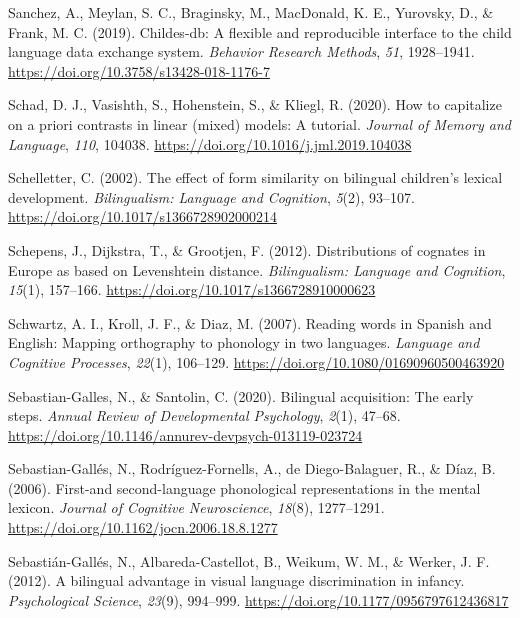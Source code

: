 \documentclass[
  12pt,
  b5paperpaper,
  twoside]{scrreprt}
\newlength{\cslhangindent}
\newlength{\cslentryspacingunit} %
\newenvironment{CSLReferences}[2] %
 {%
  \setlength{\parindent}{0pt}
  \ifodd #1
  \let\oldpar\par
  \def\par{\hangindent=\cslhangindent\oldpar}
  \fi
  \setlength{\parskip}{#2\cslentryspacingunit}
 }%
 {}
\begin{document}
\begin{CSLReferences}{1}{0}
\leavevmode{}%
Sanchez, A., Meylan, S. C., Braginsky, M., MacDonald, K. E., Yurovsky,
D., \& Frank, M. C. (2019). Childes-db: A flexible and reproducible
interface to the child language data exchange system. \emph{Behavior
Research Methods}, \emph{51}, 1928--1941.
\url{https://doi.org/10.3758/s13428-018-1176-7}

\leavevmode{}%
Schad, D. J., Vasishth, S., Hohenstein, S., \& Kliegl, R. (2020). How to
capitalize on a priori contrasts in linear (mixed) models: A tutorial.
\emph{Journal of Memory and Language}, \emph{110}, 104038.
\url{https://doi.org/10.1016/j.jml.2019.104038}

\leavevmode{}%
Schelletter, C. (2002). The effect of form similarity on bilingual
children's lexical development. \emph{Bilingualism: Language and
Cognition}, \emph{5}(2), 93--107.
\url{https://doi.org/10.1017/s1366728902000214}

\leavevmode{}%
Schepens, J., Dijkstra, T., \& Grootjen, F. (2012). Distributions of
cognates in {Europe} as based on {Levenshtein} distance.
\emph{Bilingualism: Language and Cognition}, \emph{15}(1), 157--166.
\url{https://doi.org/10.1017/s1366728910000623}

\leavevmode{}%
Schwartz, A. I., Kroll, J. F., \& Diaz, M. (2007). Reading words in
{Spanish} and {English}: Mapping orthography to phonology in two
languages. \emph{Language and Cognitive Processes}, \emph{22}(1),
106--129. \url{https://doi.org/10.1080/01690960500463920}

\leavevmode{}%
Sebastian-Galles, N., \& Santolin, C. (2020). Bilingual acquisition: The
early steps. \emph{Annual Review of Developmental Psychology},
\emph{2}(1), 47--68.
\url{https://doi.org/10.1146/annurev-devpsych-013119-023724}

\leavevmode{}%
Sebastian-Gallés, N., Rodríguez-Fornells, A., de Diego-Balaguer, R., \&
Díaz, B. (2006). First-and second-language phonological representations
in the mental lexicon. \emph{Journal of Cognitive Neuroscience},
\emph{18}(8), 1277--1291.
\url{https://doi.org/10.1162/jocn.2006.18.8.1277}

\leavevmode{}%
Sebastián-Gallés, N., Albareda-Castellot, B., Weikum, W. M., \& Werker,
J. F. (2012). A bilingual advantage in visual language discrimination in
infancy. \emph{Psychological Science}, \emph{23}(9), 994--999.
\url{https://doi.org/10.1177/0956797612436817}


\end{CSLReferences}
\end{document}
